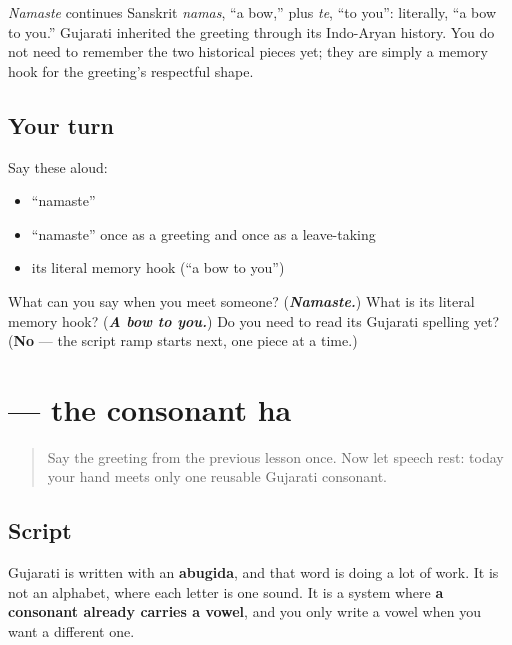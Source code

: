 \begin{cousinweb}
\emph{Namaste} continues Sanskrit \emph{namas}, \textquotedblleft{}a bow,\textquotedblright{} plus \emph{te}, \textquotedblleft{}to you\textquotedblright{}: literally, \textquotedblleft{}a bow to you.\textquotedblright{} Gujarati inherited the greeting through its Indo-Aryan history. You do not need to remember the two historical pieces yet; they are simply a memory hook for the greeting's respectful shape.
\end{cousinweb}

\subsection*{Your turn}
Say these aloud:

\begin{itemize}
\raggedright
  \item \textquotedblleft{}namaste\textquotedblright{}
  \item \textquotedblleft{}namaste\textquotedblright{} once as a greeting and once as a leave-taking
  \item its literal memory hook (\textquotedblleft{}a bow to you\textquotedblright{})
\end{itemize}

\begin{tcolorbox}[breakable,colback=teal!4,colframe=teal!35!black,title={Before you move on}]
What can you say when you meet someone? (\emph{\textbf{Namaste.}}) What is its literal memory hook? (\emph{\textbf{A bow to you.}}) Do you need to read its Gujarati spelling yet? (\textbf{No} — the script ramp starts next, one piece at a time.)
\end{tcolorbox}
\section[ha]{ — the consonant ha}

\label{lesson:GU-W01-ha}



\begin{quote}
Say the greeting from the previous lesson once. Now let speech rest: today your hand meets only one reusable Gujarati consonant.
\end{quote}

\subsection*{Script}
Gujarati is written with an \textbf{abugida}, and that word is doing a lot of work. It is not an alphabet, where each letter is one sound. It is a system where \textbf{a consonant already carries a vowel}, and you only write a vowel when you want a different one.

